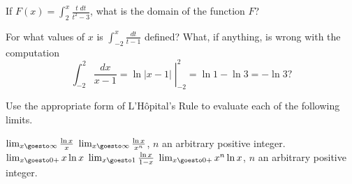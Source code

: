 \begin{exercises}
If $F(x) = \int_2^x \frac{t\;dt}{t^2-3}$,
what is the domain of the function $F$?

\begin{exenum}
\x
For what values of $x$ is $\int_{-2}^x \frac{dt}{t-1}$
defined?
\x
What, if anything, is wrong with the computation
\[
\int_{-2}^2 \left.\frac{dx}{x-1} = \ln|x-1| \; \right|_{-2}^2
= \ln 1 - \ln 3 = -\ln 3
?
\]
\end{exenum}

Use the appropriate form of L'H\^opital's Rule
to evaluate each of the following limits.
\begin{exenum}
\x
$\lim_{x\goesto\infty} \frac{\ln x}x$
\x
$\lim_{x\goesto\infty} \frac{\ln x}{x^n}$,
$n$ an arbitrary positive integer.
\x
$\lim_{x\goesto0+} x \ln x$
\x
$\lim_{x\goesto1} \frac{\ln x}{1-x}$
\x
$\lim_{x\goesto0+} x^n \ln x$,
$n$ an arbitrary positive integer.
\end{exenum}

\end{exercises}
